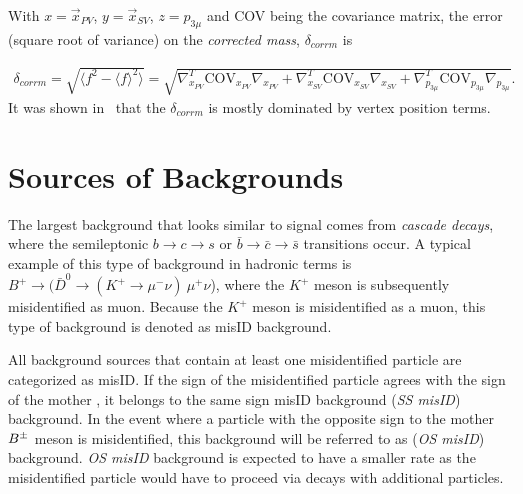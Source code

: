 With $x=\vec{{x}}_{PV}$, $y=\vec{{x}}_{SV}$, $z=p_{3\mu}$ and \rm{COV} being the covariance matrix, the error (square root of variance) on the \emph{corrected mass}, $\delta_{corrm}$ is
%
%


\begin{equation}
\begin{aligned}
	\delta_{corrm} = \sqrt{ \langle f^{2}-\langle f \rangle^{2} \rangle} = \sqrt{\nabla^{T}_{x_{PV}} \mathrm{COV}_{x_{PV}} \nabla_{x_{PV}} + \nabla^{T}_{x_{SV}} \mathrm{COV}_{x_{SV}} \nabla_{x_{SV}} + \nabla^{T}_{p_{3\mu}} \mathrm{COV}_{p_{3\mu}} \nabla_{p_{3\mu}}}. 
\end{aligned}
\end{equation}
It was shown in~\cite{Egede:1694339} that the $\delta_{corrm}$ is mostly dominated by vertex position terms.

\section{Sources of Backgrounds}
\label{bkgquick}
The largest background that looks similar to signal comes from \textit{cascade decays}, where the semileptonic $b \rightarrow c \rightarrow s$ or $\bar{b} \rightarrow \bar{c} \rightarrow \bar{s}$ transitions occur. A typical example of this type of background in hadronic terms is $B^{+} \rightarrow (\bar{D}^{0} \rightarrow (K^{+} \rightarrow \mu^{-} \nu)\ \mu^{+} \nu$), where the $K^{+}$ meson is subsequently misidentified as muon. Because the $K^{+}$ meson is misidentified as a muon, this type of background is denoted as misID background.

All background sources that contain at least one misidentified particle are categorized as misID. If the sign of the misidentified particle agrees with the sign of the mother \Bpm, it belongs to the same sign misID background (\textit{SS misID}) background. In the event where a particle with the opposite sign to the mother ${{B}^\pm}$ meson is misidentified, this background will be referred to as (\textit{OS misID}) background. \textit{OS misID} background is expected to have a smaller rate as the misidentified particle would have to proceed via decays with additional particles.

